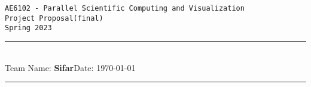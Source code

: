 \documentclass[11pt,a4paper]{article}
\newcommand{\student}{\textbf{Sifar}}
\begin{document}
\thispagestyle{empty}
\begin{center}
	\texttt{\Large AE6102 - Parallel Scientific Computing and Visualization}\\
        \vspace*{0.2cm}
        \texttt{\Large Project Proposal(final)}\\
        \vspace*{0.2cm}
	\texttt{\large Spring 2023}
\end{center}
\noindent
\rule{19cm}{0.2cm}\\[0.3cm]
Team Name: \student \hfill Date: \today\\[0.1cm]
\rule{19cm}{0.05cm}
\vspace{0.1cm}

\vspace*{-0.5cm}
\end{document}
